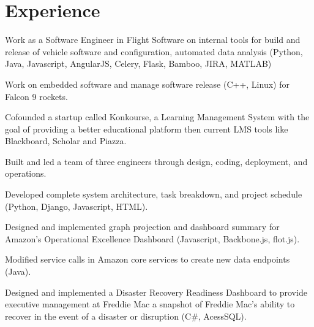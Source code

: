 \documentclass[]{mdavoodi-resume-openfont}
\begin{document}

\section{Experience}

\begin{tightemize}
\item Work as a Software Engineer in Flight Software on internal tools for build and release of vehicle software and configuration, automated data analysis (Python, Java, Javascript, AngularJS, Celery, Flask, Bamboo, JIRA, MATLAB) \item Work on embedded software and manage software release (C++, Linux) for Falcon 9 rockets.
\end{tightemize}
\sectionsep

\begin{tightemize}
\item Cofounded a startup called Konkourse, a Learning Management System with the goal of providing a better educational platform then current LMS tools like Blackboard, Scholar and Piazza. 
\item Built and led a team of three engineers through design, coding, deployment, and operations.
\item Developed complete system architecture, task breakdown, and project schedule  (Python, Django, Javascript, HTML).\end{tightemize}
\sectionsep

\begin{tightemize}
\item Designed and implemented graph projection and dashboard summary for Amazon's Operational Excellence Dashboard (Javascript, Backbone.js, flot.js). 
\item Modified service calls in Amazon core services to create new data endpoints (Java).
\end{tightemize}
\sectionsep

\begin{tightemize}
\item Designed and implemented a Disaster Recovery Readiness Dashboard to provide executive management at Freddie Mac a snapshot of Freddie Mac’s ability to recover in the event of a disaster or disruption (C\#, AcessSQL).\end{tightemize}
\end{document}
